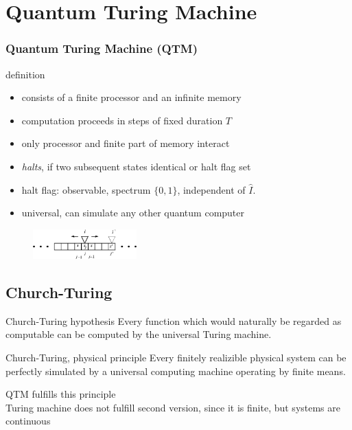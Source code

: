 \documentclass{beamer}
\begin{document}
\section{Quantum Turing Machine}
%
\begin{frame}
 \tableofcontents
\end{frame}
\begin{frame}
	\frametitle{Quantum Turing Machine (QTM)}
	\begin{block}{definition}
	    \begin{itemize}
			\item consists of a finite processor and an infinite memory
			\item computation proceeds in steps of fixed duration $T$
			\item only processor and finite part of memory interact
			\item \emph{halts}, if two subsequent states identical or halt flag set
			\item halt flag: observable, spectrum $\{0,1\}$, independent of $\hat{I}$.
			\item universal, can simulate any other quantum computer
		\end{itemize}
	\end{block}
	\begin{figure}
		\includegraphics[width=4cm]{fig/qtm.png}
	\end{figure}
\end{frame}
%
\subsection{Church-Turing}
\begin{frame}
    \begin{block}{Church-Turing hypothesis}
        Every function which would naturally be regarded as computable can be computed by the universal Turing machine.
    \end{block}
    \begin{block}{Church-Turing, physical principle}
        Every finitely realizible physical system can be perfectly simulated by a universal computing machine operating by finite means.
    \end{block}
    QTM fulfills this principle\\
	Turing machine does not fulfill second version, since it is finite, but systems are continuous
\end{frame}
%
\end{document}
